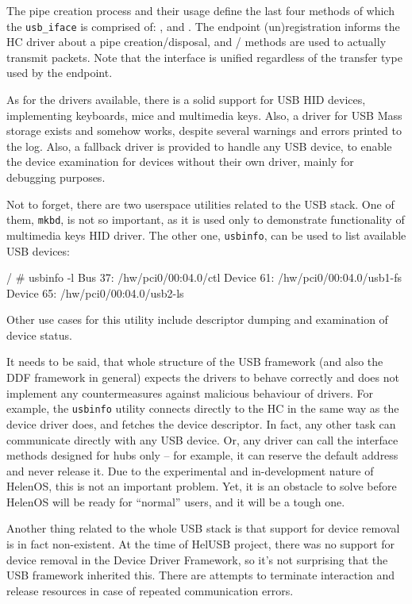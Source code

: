 The pipe creation process and their usage define the last four methods of which
the \texttt{usb\_iface} is comprised of: , 
and . The endpoint (un)registration informs the HC driver about
a pipe creation/disposal, and / methods are used to
actually transmit packets. Note that the interface is unified regardless of the
transfer type used by the endpoint.

As for the drivers available, there is a solid support for USB HID devices,
implementing keyboards, mice and multimedia keys. Also, a driver for USB Mass
storage exists and somehow works, despite several warnings and errors printed
to the log. Also, a fallback driver is provided to handle any USB device, to
enable the device examination for devices without their own driver, mainly for
debugging purposes.

Not to forget, there are two userspace utilities related to the USB stack. One
of them, \texttt{mkbd}, is not so important, as it is used only to demonstrate
functionality of multimedia keys HID driver. The other one, \texttt{usbinfo},
can be used to list available USB devices:

\begin{bdsh}
/ # usbinfo -l
Bus 37: /hw/pci0/00:04.0/ctl
	Device 61: /hw/pci0/00:04.0/usb1-fs
	Device 65: /hw/pci0/00:04.0/usb2-ls
\end{bdsh}

Other use cases for this utility include descriptor dumping and examination of
device status.

It needs to be said, that whole structure of the USB framework (and also the
DDF framework in general) expects the drivers to behave correctly and does not
implement any countermeasures against malicious behaviour of drivers. For
example, the \texttt{usbinfo} utility connects directly to the HC in the same
way as the device driver does, and fetches the device descriptor. In fact, any
other task can communicate directly with any USB device. Or, any driver can
call the interface methods designed for hubs only -- for example, it can
reserve the default address and never release it. Due to the experimental and
in-development nature of HelenOS, this is not an important problem. Yet, it is
an obstacle to solve before HelenOS will be ready for ``normal'' users, and it
will be a tough one.

Another thing related to the whole USB stack is that support for device
removal is in fact non-existent. At the time of HelUSB project, there was no
support for device removal in the Device Driver Framework, so it's not
surprising that the USB framework inherited this. There are attempts to
terminate interaction and release resources in case of repeated communication
errors.
